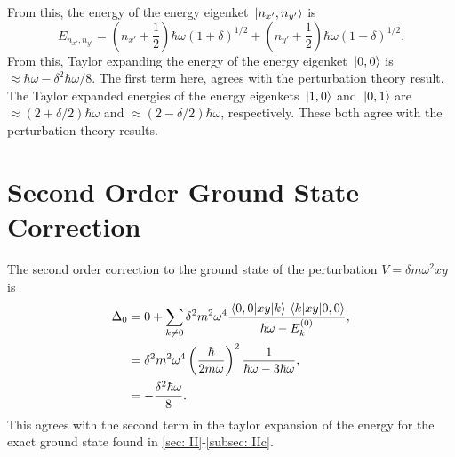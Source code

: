 \documentclass[
a4paper,
10pt,
twoside,
]{article}
\begin{document}
From this, the energy of the energy eigenket $\ket*{n_{x'},n_{y'}}$ is
\begin{equation}
	E_{n_{x'},n_{y'}} = \left(n_{x'}+\frac{1}{2}\right)\hbar\omega(1+\delta)^{1/2}+\left(n_{y'}+\frac{1}{2}\right)\hbar\omega(1-\delta)^{1/2}.
\end{equation}
From this, Taylor expanding the energy of the energy eigenket $\ket*{0,0}$ is $\approx \hbar\omega - \delta^2\hbar\omega/8$.
The first term here, agrees with the perturbation theory result.
The Taylor expanded energies of the energy eigenkets $\ket*{1,0}$ and $\ket*{0,1}$ are $\approx (2+\delta/2)\hbar\omega$ and $\approx (2-\delta/2)\hbar\omega$, respectively.
These both agree with the perturbation theory results.

\section{Second Order Ground State Correction}\label{sec: III}

The second order correction to the ground state of the perturbation $V = \delta m \omega^2 xy$ is
\begin{align}
	\Delta_0 &= 0 + \sum_{k\neq 0} \delta^2m^2\omega^4\frac{\mel*{0,0}{xy}{k}\mel*{k}{xy}{0,0}}{\hbar\omega - E_k^{(0)}},\\
	&= \delta^2 m^2\omega^4\left(\frac{\hbar}{2m\omega}\right)^2\frac{1}{\hbar\omega - 3\hbar\omega},\\
	&= -\frac{\delta^2\hbar\omega}{8}.
\end{align}
This agrees with the second term in the taylor expansion of the energy for the exact ground state found in \ref{sec: II}-\ref{subsec: IIc}.
\end{document}
